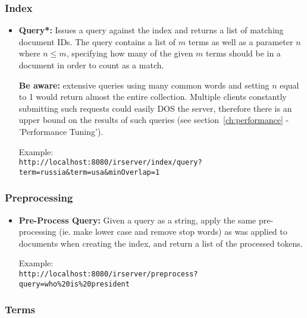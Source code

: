 \documentclass[a4paper,11pt]{article}
\begin{document}
\subsubsection{Index}

\begin{itemize}
\item \textbf{Query*:} Issues a query against the index and returns a list of matching document IDs. The query contains a list of $m$ terms as well as a parameter $n$ where $n \leq m$, specifying how many of the given $m$ terms should be in a document in order to count as a match.

\textbf{Be aware:} extensive queries using many common words and setting $n$ equal to 1 would return almost the entire collection. Multiple clients constantly submitting such requests could easily DOS the server, therefore there is an upper bound on the results of such queries (see section~\ref{ch:performance} - 'Performance Tuning').
\begin{leftbar}
Example:\\
\texttt{http://localhost:8080/irserver/index/query?term=russia\&term=usa\&minOverlap=1}
\end{leftbar}
\end{itemize}

\subsubsection{Preprocessing}

\begin{itemize}
\item \textbf{Pre-Process Query:} Given a query as a string, apply the same pre-processing (ie. make lower case and remove stop words) as was applied to documents when creating the index, and return a list of the processed tokens. 
\begin{leftbar}
Example:\\
\texttt{http://localhost:8080/irserver/preprocess?query=who\%20is\%20president}
\end{leftbar}

\end{itemize}

\subsubsection{Terms}
\end{document}
